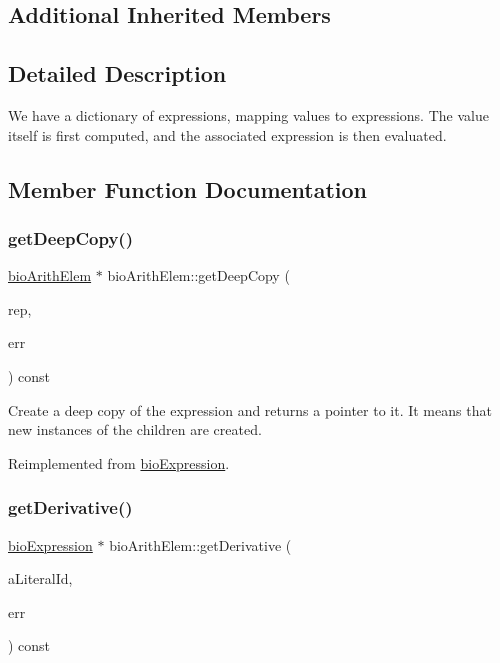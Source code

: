 \subsection*{Additional Inherited Members}


\subsection{Detailed Description}
We have a dictionary of expressions, mapping values to expressions. The value itself is first computed, and the associated expression is then evaluated. 

\subsection{Member Function Documentation}
\mbox{\label{classbio_arith_elem_a3635350e02e428a9fe9dfeaac6247514}} 
\subsubsection{\texorpdfstring{get\+Deep\+Copy()}{getDeepCopy()}}
{\footnotesize\ttfamily \hyperlink{classbio_arith_elem}{bio\+Arith\+Elem} $\ast$ bio\+Arith\+Elem\+::get\+Deep\+Copy (\begin{DoxyParamCaption}\item[{\hyperlink{classbio_expression_repository}{bio\+Expression\+Repository} $\ast$}]{rep,  }\item[{pat\+Error $\ast$\&}]{err }\end{DoxyParamCaption}) const\hspace{0.3cm}{\ttfamily [virtual]}}

Create a deep copy of the expression and returns a pointer to it. It means that new instances of the children are created. 

Reimplemented from \hyperlink{classbio_expression_a4ee1b8add634078a02eaae26cd40dcc8}{bio\+Expression}.

\mbox{\label{classbio_arith_elem_a0905b898fe28bad14df85cd2bbcf1e1c}} 
\subsubsection{\texorpdfstring{get\+Derivative()}{getDerivative()}}
{\footnotesize\ttfamily \hyperlink{classbio_expression}{bio\+Expression} $\ast$ bio\+Arith\+Elem\+::get\+Derivative (\begin{DoxyParamCaption}\item[{pat\+U\+Long}]{a\+Literal\+Id,  }\item[{pat\+Error $\ast$\&}]{err }\end{DoxyParamCaption}) const\hspace{0.3cm}{\ttfamily [virtual]}}

